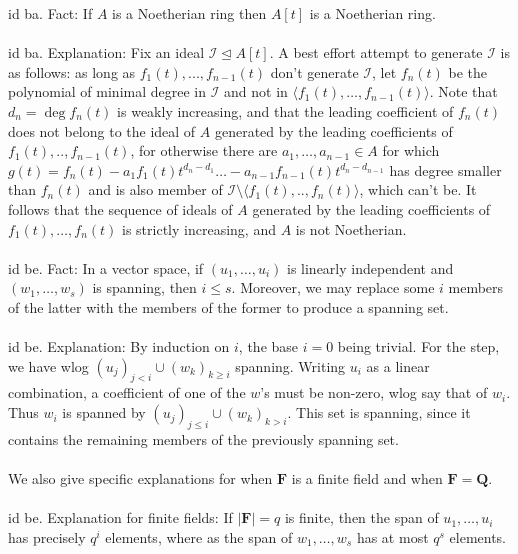\documentclass[oneside]{book}
\newcommand{\F}{\mathbf{F}}
\newcommand{\Q}{\mathbf{Q}}
\newcommand{\II}{\mathscr{I}}
\newcommand{\ideal}{\trianglelefteq}
\newcommand{\gen}[1]{\langle #1\rangle}
\newcommand{\abs}[1]{\left\lvert #1\right\rvert}
\begin{document}
id ba. Fact: If $A$ is a Noetherian ring then $A[t]$ is a Noetherian ring.  \\\\


id ba. Explanation: Fix an ideal $\II\ideal A[t]$. A best effort attempt to generate $\II$ is as follows: as long as $f_1(t),...,f_{n-1}(t)$ don't generate $\II$, let $f_n(t)$ be the polynomial of minimal degree in $\II$ and not in $\gen{f_1(t),\dots,f_{n-1}(t)}$. Note that $d_n=\deg f_n(t)$ is weakly increasing, and that the leading coefficient of $f_n(t)$ does not belong to the ideal of $A$ generated by the leading coefficients of  $f_1(t),..,f_{n-1}(t)$, for otherwise there are $a_1,\dots,a_{n-1}\in A$ for which $g(t)=f_n(t)-a_1f_1(t)t^{d_n-d_1}\dots-a_{n-1}f_{n-1}(t)t^{d_n-d_{n-1}}$ has degree smaller than $f_n(t)$ and is also member of $\II\setminus \gen{f_1(t),..,f_n(t)}$, which can't be. It follows that the sequence of ideals of $A$ generated by the leading coefficients of $f_1(t),\dots,f_n(t)$ is strictly increasing, and $A$ is not Noetherian. \\\\


id be. Fact: In a vector space, if $(u_1,\dots,u_i)$ is linearly independent and $(w_1,\dots,w_s)$ is spanning, then $i\le s$. Moreover, we may replace some $i$ members of the latter with the members of the former to produce a spanning set.  \\\\


id be. Explanation: By induction on $i$, the base $i=0$ being trivial. For the step, we have wlog $(u_j)_{j<i}\cup (w_k)_{k\ge i}$ spanning. Writing $u_i$ as a linear combination, a coefficient of one of the $w$'s must be non-zero, wlog say that of $w_i$. Thus $w_i$ is spanned by $(u_j)_{j\le i}\cup (w_k)_{k>i}$. This set is spanning, since it contains the remaining members of the previously spanning set.   \\\\


We also give specific explanations for when $\F$ is a finite field and when $\F=\Q$.\\\\

id be. Explanation for finite fields: If $\abs{\F}=q$ is finite, then the span of $u_1,\dots,u_i$ has precisely $q^i$ elements, where as the span of $w_1,\dots,w_s$ has at most $q^s$ elements.   \\\\
\end{document}
